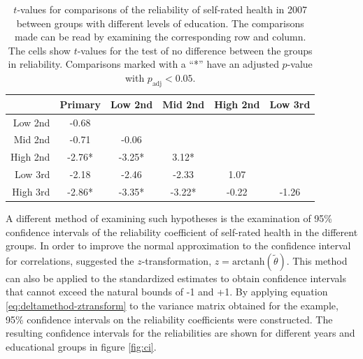 \documentclass[a4paper, 11pt]{article}
\newcommand{\thetastan}{\tilde{\theta}}
\newcommand{\0}{\boldsymbol{0}}
\newcommand{\arctanh}{\mathrm{arctanh}}
\begin{document}
\fi
\begin{table}[tbh]
\begin{center}
\begin{tabular}{rccccc}
  \hline
 & Primary & Low 2nd & Mid 2nd & High 2nd & Low 3rd \\
   \hline
  Low 2nd & -0.68 \\ 
  Mid 2nd & -0.71 & -0.06  \\ 
  High 2nd & -2.76* & -3.25* &3.12*   \\ 
  Low 3rd & -2.18 & -2.46 & -2.33 & 1.07   \\ 
  High 3rd & -2.86* & -3.35* & -3.22* & -0.22 & -1.26  \\ 
   \hline
\end{tabular}\caption{$t$-values for comparisons of the reliability of self-rated health in 2007 
	 between groups with different levels of education. The comparisons made can be read 
	by examining the corresponding row and column. The cells show $t$-values for the test of no difference
	 between the groups in reliability. Comparisons marked with a ``*'' have an adjusted $p$-value
	 with $p_{\mathrm{adj}}<0.05$.}\label{tab:tests}
\end{center}
\end{table}



A different method of examining such hypotheses is the examination of 95\% confidence intervals of the reliability coefficient of self-rated health in the different groups.
In order to improve the normal approximation to the confidence interval for correlations, \cite{fisher1925statistical} suggested the $z$-transformation, $z = \arctanh(\thetastan)$. This method can also be applied to the standardized estimates to obtain confidence 
intervals that cannot exceed the natural bounds of -1 and +1. By applying equation \ref{eq:deltamethod-ztransform} to the variance
matrix obtained for the example, 95\% confidence intervals on the reliability coefficients were constructed. The resulting confidence
intervals for the reliabilities are shown for different years and educational groups in figure \ref{fig:ci}.
\end{document}

